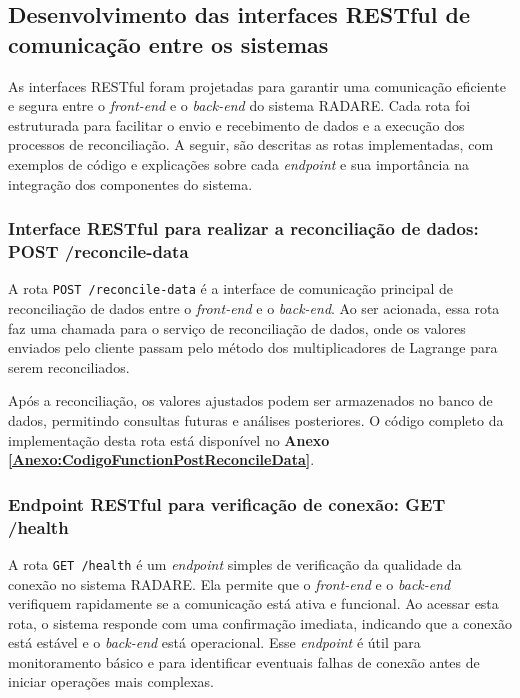 \subsection{Desenvolvimento das interfaces RESTful de comunicação entre os sistemas}

As interfaces RESTful foram projetadas para garantir uma comunicação eficiente e segura entre o \textit{front-end} e o \textit{back-end} do sistema RADARE. Cada rota foi estruturada para facilitar o envio e recebimento de dados e a execução dos processos de reconciliação. A seguir, são descritas as rotas implementadas, com exemplos de código e explicações sobre cada \textit{endpoint} e sua importância na integração dos componentes do sistema.

\subsubsection{Interface RESTful para realizar a reconciliação de dados: POST /reconcile-data}

A rota \texttt{POST /reconcile-data} é a interface de comunicação principal de reconciliação de dados entre o \textit{front-end} e o \textit{back-end}. Ao ser acionada, essa rota faz uma chamada para o serviço de reconciliação de dados, onde os valores enviados pelo cliente passam pelo método dos multiplicadores de Lagrange para serem reconciliados.

Após a reconciliação, os valores ajustados podem ser armazenados no banco de dados, permitindo consultas futuras e análises posteriores. O código completo da implementação desta rota está disponível no \textbf{Anexo \ref{Anexo:CodigoFunctionPostReconcileData}}.


\subsubsection{Endpoint RESTful para verificação de conexão: GET /health}

A rota \texttt{GET /health} é um \textit{endpoint} simples de verificação da qualidade da conexão no sistema RADARE. Ela permite que o \textit{front-end} e o \textit{back-end} verifiquem rapidamente se a comunicação está ativa e funcional. Ao acessar esta rota, o sistema responde com uma confirmação imediata, indicando que a conexão está estável e o \textit{back-end} está operacional. Esse \textit{endpoint} é útil para monitoramento básico e para identificar eventuais falhas de conexão antes de iniciar operações mais complexas.

